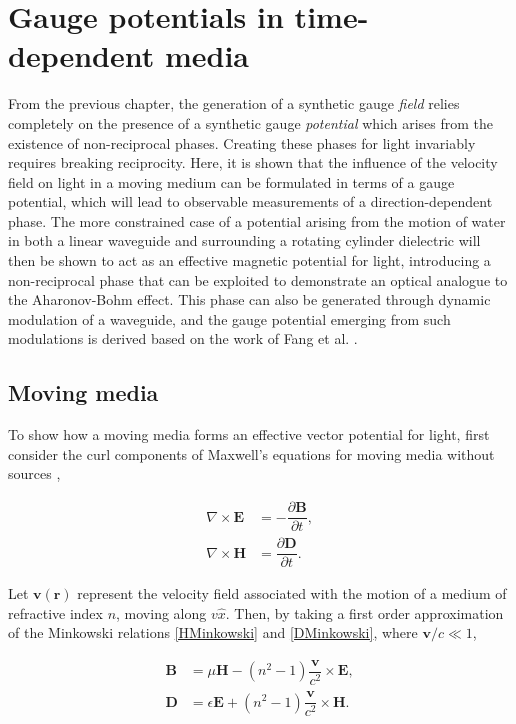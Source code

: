 \chapter{Gauge potentials in time-dependent media}
\label{chapter:theory}

From the previous chapter, the generation of a synthetic gauge \textit{field} relies completely on the presence of a synthetic gauge \textit{potential} which arises from the existence of non-reciprocal phases. Creating these phases for light invariably requires breaking reciprocity. Here, it is shown that the influence of the velocity field on light in a moving medium can be formulated in terms of a gauge potential, which will lead to observable measurements of a direction-dependent phase. The more constrained case of a potential arising from the motion of water in both a linear waveguide and surrounding a rotating cylinder dielectric will then be shown to act as an effective magnetic potential for light, introducing a non-reciprocal phase that can be exploited to demonstrate an optical analogue to the Aharonov-Bohm effect. This phase can also be generated through dynamic modulation of a waveguide, and the gauge potential emerging from such modulations is derived based on the work of Fang et al. \cite{Fang2012}.

\section{Moving media}

To show how a moving media forms an effective vector potential for light, first consider the curl components of Maxwell's equations for moving media without sources \cite{Mansuripur2009a},

\begin{align} 
	\nabla \times \bm{E} &= -\dfrac{\partial \bm{B}}{\partial t}, \label{mwell3}\\
	\nabla \times \bm{H} &= \dfrac{\partial \bm{D}}{\partial t} \label{mwell4}.
\end{align}

Let $\bm{v(r)}$ represent the velocity field associated with the motion of a medium of refractive index $n$, moving along $v \hat{x}$. Then, by taking a first order approximation of the Minkowski relations \ref{HMinkowski} and \ref{DMinkowski}, where $\textbf{v}/c \ll 1$,

\begin{align}
	\bm{B} &= \mu \bm{H} - (n^2 - 1) \dfrac{\bm{v}}{c^2} \times \bm{E}, \\
	\bm{D} &= \epsilon \bm{E} + (n^2 - 1) \dfrac{\bm{v}}{c^2} \times \bm{H}.
\end{align}

